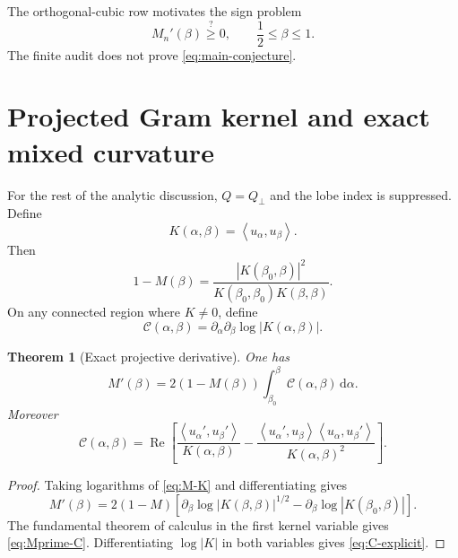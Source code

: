 \documentclass[11pt]{amsart}
\numberwithin{equation}{section}
\theoremstyle{plain}
\newtheorem{theorem}{Theorem}[section]
\theoremstyle{definition}
\theoremstyle{remark}
\newcommand{\Ccal}{\mathcal C}
\newcommand{\Ree}{\operatorname{Re}}
\newcommand{\dd}{\,\mathrm d}
\newcommand{\ip}[2]{\left\langle #1,#2\right\rangle}
\begin{document}
The orthogonal-cubic row motivates the sign problem
\begin{equation}
\boxed{
M_n'(\beta)\stackrel{?}{\ge}0,
\qquad \frac12\le\beta\le1.
}
\label{eq:main-conjecture}
\end{equation}
The finite audit does not prove \eqref{eq:main-conjecture}.

\section{Projected Gram kernel and exact mixed curvature}
\label{sec:kernel}

For the rest of the analytic discussion, $Q=Q_\perp$ and the lobe index is suppressed.  Define
\begin{equation}
K(\alpha,\beta)=\ip{u_\alpha}{u_\beta}.
\label{eq:K}
\end{equation}
Then
\begin{equation}
1-M(\beta)=\frac{|K(\beta_0,\beta)|^2}{K(\beta_0,\beta_0)K(\beta,\beta)}.
\label{eq:M-K}
\end{equation}
On any connected region where $K\ne0$, define
\begin{equation}
\Ccal(\alpha,\beta)=\partial_\alpha\partial_\beta\log|K(\alpha,\beta)|.
\label{eq:C}
\end{equation}

\begin{theorem}[Exact projective derivative]
\label{thm:Mprime}
One has
\begin{equation}
\boxed{
M'(\beta)=2(1-M(\beta))
\int_{\beta_0}^{\beta}\Ccal(\alpha,\beta)\dd\alpha.
}
\label{eq:Mprime-C}
\end{equation}
Moreover
\begin{equation}
\Ccal(\alpha,\beta)
=\Ree\left[
\frac{\ip{u_\alpha'}{u_\beta'}}{K(\alpha,\beta)}
-\frac{\ip{u_\alpha'}{u_\beta}\ip{u_\alpha}{u_\beta'}}{K(\alpha,\beta)^2}
\right].
\label{eq:C-explicit}
\end{equation}
\end{theorem}

\begin{proof}
Taking logarithms of \eqref{eq:M-K} and differentiating gives
\begin{equation}
M'(\beta)=2(1-M)
\left[
\partial_\beta\log|K(\beta,\beta)|^{1/2}
-\partial_\beta\log|K(\beta_0,\beta)|
\right].
\end{equation}
The fundamental theorem of calculus in the first kernel variable gives \eqref{eq:Mprime-C}.  Differentiating $\log|K|$ in both variables gives \eqref{eq:C-explicit}.
\end{proof}
\end{document}
